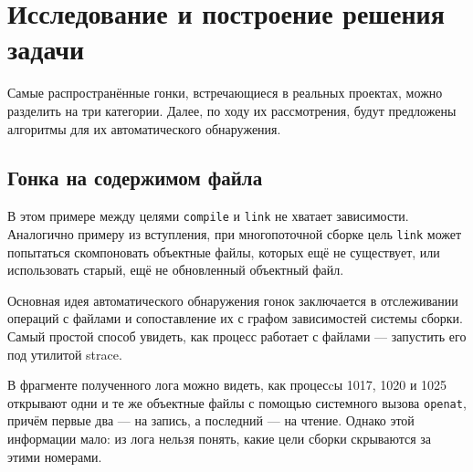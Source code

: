 \section{Исследование и построение решения задачи}
\label{sec:Chapter3} 


Самые распространённые гонки, встречающиеся в реальных проектах, можно разделить на три категории. Далее, по ходу их рассмотрения, будут предложены алгоритмы для их автоматического обнаружения.

\subsection{Гонка на содержимом файла}
\label{subsec:file-content-races}



В этом примере между целями \texttt{compile} и \texttt{link} не хватает зависимости. Аналогично примеру из вступления, при многопоточной сборке цель \texttt{link} может попытаться скомпоновать объектные файлы, которых ещё не существует, или использовать старый, ещё не обновленный объектный файл.

Основная идея автоматического обнаружения гонок заключается в отслеживании операций с файлами и сопоставление их с графом зависимостей системы сборки. Самый простой способ увидеть, как процесс работает с файлами --- запустить его под утилитой strace.



В фрагменте полученного лога можно видеть, как процесcы 1017, 1020 и 1025 открывают одни и те же объектные файлы с помощью системного вызова \texttt{openat}, причём первые два --- на запись, а последний --- на чтение. Однако этой информации мало: из лога нельзя понять, какие цели сборки скрываются за этими номерами.

